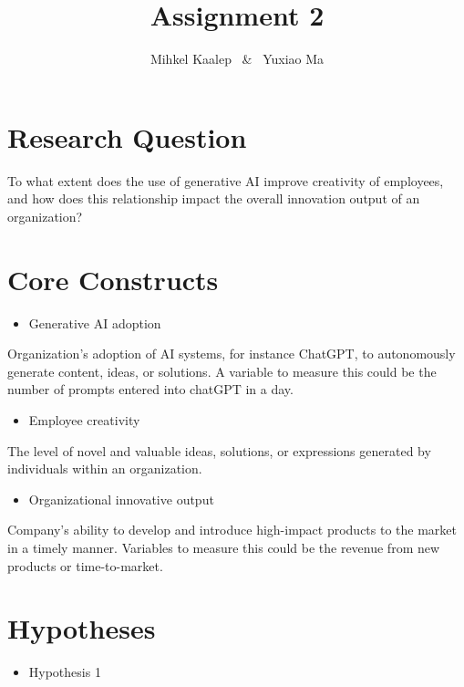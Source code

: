\documentclass[UTF8,a4paper,AutoFakeBold,AutoFakeSlant]{article}
\title{\textbf{\textsf{{\textsf{Assignment 2}}}}}
\author{\tnewroman Mihkel Kaalep ~\&~ Yuxiao Ma}
\date{}
\begin{document}
\maketitle

\section{Research Question}

To what extent does the use of generative AI improve creativity of employees, and how does this relationship impact the overall innovation output of an organization?


\section{Core Constructs}

\begin{itemize}
    \item Generative AI adoption
\end{itemize}

Organization’s adoption of AI systems, for instance ChatGPT, to autonomously generate content, ideas, or solutions. A variable to measure this could be the number of prompts entered into chatGPT in a day.

\begin{itemize}
    \item Employee creativity
\end{itemize}

The level of novel and valuable ideas, solutions, or expressions generated by individuals within an organization.

\begin{itemize}
    \item Organizational innovative output
\end{itemize}

Company’s ability to develop and introduce high-impact products to the market in a timely manner. Variables to measure this could be the revenue from new products or time-to-market.



\section{Hypotheses}

\begin{itemize}
    \item Hypothesis 1
\end{itemize}
\end{document}
